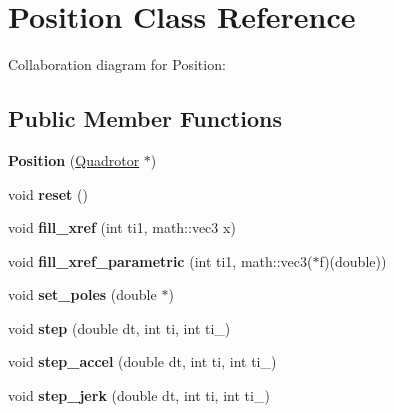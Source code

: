 \hypertarget{classPosition}{
\section{Position Class Reference}
\label{classPosition}
}
Collaboration diagram for Position:\subsection*{Public Member Functions}
\begin{DoxyCompactItemize}
\item 
\hypertarget{classPosition_a21dc157ba98b5d2611370bf3f349736a}{
{\bfseries Position} (\hyperlink{classQuadrotor}{Quadrotor} $\ast$)}
\label{classPosition_a21dc157ba98b5d2611370bf3f349736a}

\item 
\hypertarget{classPosition_a3edff02174569169d30df5b451eebda0}{
void {\bfseries reset} ()}
\label{classPosition_a3edff02174569169d30df5b451eebda0}

\item 
\hypertarget{classPosition_a924a092bf7875bdbcdc2e82003f4a115}{
void {\bfseries fill\_\-xref} (int ti1, math::vec3 x)}
\label{classPosition_a924a092bf7875bdbcdc2e82003f4a115}

\item 
\hypertarget{classPosition_a7dcec18ff9b16b1f239ff4b2186af9da}{
void {\bfseries fill\_\-xref\_\-parametric} (int ti1, math::vec3($\ast$f)(double))}
\label{classPosition_a7dcec18ff9b16b1f239ff4b2186af9da}

\item 
\hypertarget{classPosition_aba6365e7fe72d0640ad071c804099b34}{
void {\bfseries set\_\-poles} (double $\ast$)}
\label{classPosition_aba6365e7fe72d0640ad071c804099b34}

\item 
\hypertarget{classPosition_a6953d71c48f37e8e761ee97a127e1187}{
void {\bfseries step} (double dt, int ti, int ti\_)}
\label{classPosition_a6953d71c48f37e8e761ee97a127e1187}

\item 
\hypertarget{classPosition_a0f0e34c5613c19185eccd70e61208dfd}{
void {\bfseries step\_\-accel} (double dt, int ti, int ti\_)}
\label{classPosition_a0f0e34c5613c19185eccd70e61208dfd}

\item 
\hypertarget{classPosition_a61b9bee4144b6561f6f4bcdf7450033c}{
void {\bfseries step\_\-jerk} (double dt, int ti, int ti\_)}
\label{classPosition_a61b9bee4144b6561f6f4bcdf7450033c}


\end{DoxyCompactItemize}
